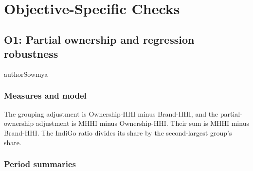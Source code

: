 \section{Objective-Specific Checks}
\label{app:results-details}
\subsection{O1: Partial ownership and regression robustness}
\label{app:results-o1}
\begin{mergedcontribution}{authorSowmya}
\subsubsection{Measures and model}
\label{app:o1-definitions}
\label{app:o1-dictionary}
The grouping adjustment is Ownership-HHI minus Brand-HHI, and the partial-ownership adjustment is MHHI minus Ownership-HHI. Their sum is MHHI minus Brand-HHI. The IndiGo ratio divides its share by the second-largest group's share.



\subsubsection{Period summaries}
\label{app:eda-national-inputs}


\end{mergedcontribution}
